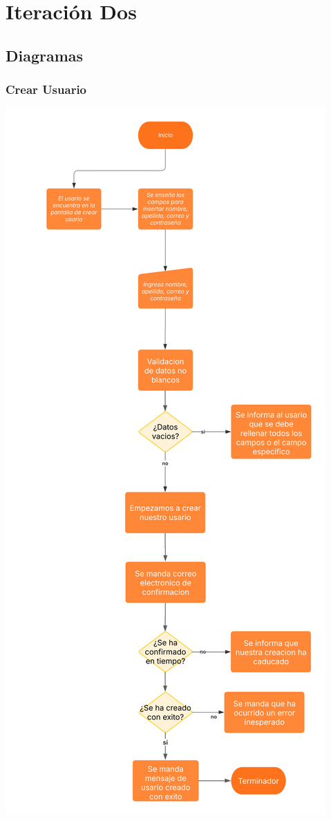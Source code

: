 \section{Iteración Dos}

\subsection{Diagramas}
\subsubsection*{Crear Usuario}
\begin{center}
    \includegraphics[scale = .65]{Ite02/CrearUsario-1.png}
\end{center}

